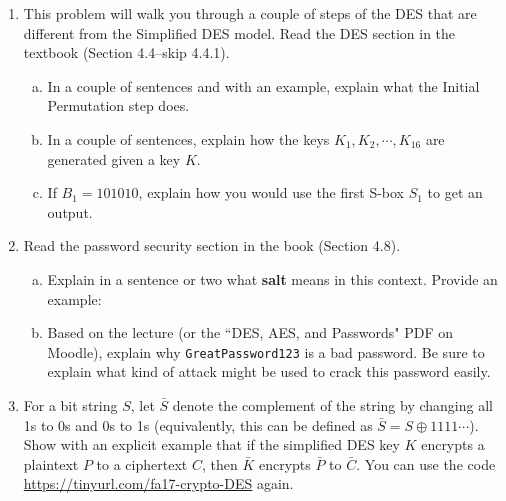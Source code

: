 \documentclass[12pt]{amsart}
\theoremstyle{plain}
\theoremstyle{definition}
\begin{document}
\begin{enumerate}[1.]
	\item This problem will walk you through a couple of steps of the DES that are different from the Simplified DES model.  Read the DES section in the textbook (Section 4.4--skip 4.4.1).
	\begin{enumerate}[a.]
		\item In a couple of sentences and with an example, explain what the Initial Permutation step does.
		\begin{framed}
		\vspace{1in}
		\end{framed}
		\item In a couple of sentences, explain how the keys $K_1, K_2, \cdots, K_{16}$ are generated given a key $K$.
		\begin{framed}
		\vspace{1in}
		\end{framed}
		\item If $B_1 = 101010$, explain how you would use the first S-box $S_1$ to get an output.
		\begin{framed}
		\vspace{1in}
		\end{framed}
	\end{enumerate}
	\item Read the password security section in the book (Section 4.8).
		\begin{enumerate}[a.]
		\item Explain in a sentence or two what \textbf{salt} means in this context.  Provide an example:
		\begin{framed}
		\vspace{1.5in}
		\end{framed}
		 \item Based on the lecture (or the ``DES, AES, and Passwords" PDF on Moodle), explain why \texttt{GreatPassword123} is a bad password.  Be sure to explain what kind of attack might be used to crack this password easily.
		\begin{framed}
		\vspace{2in}
		\end{framed}
		\end{enumerate}
	\item For a bit string $S$, let $\bar{S}$ denote the complement of the string by changing all 1s to 0s and 0s to 1s (equivalently, this can be defined as $\bar{S} = S \oplus 1111\cdots$).  Show with an explicit example that if the simplified DES key $K$ encrypts a plaintext $P$ to a ciphertext $C$, then $\bar{K}$ encrypts $\bar{P}$ to $\bar{C}$.  You can use the code  \url{https://tinyurl.com/fa17-crypto-DES} again.

\end{enumerate}
\end{document}
